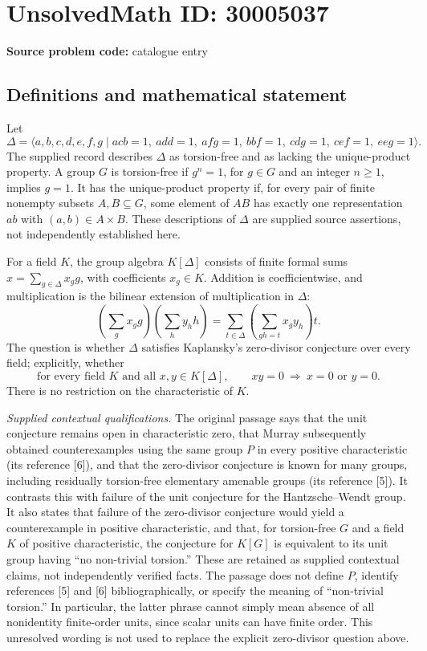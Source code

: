 \documentclass[11pt]{article}
\begin{document}
\section*{UnsolvedMath ID: 30005037}
\textbf{Source problem code:} catalogue entry
\subsection{Definitions and mathematical statement}
Let
\[
\Delta=\langle a,b,c,d,e,f,g\mid acb=1,\ add=1,\ afg=1,\ bbf=1,\ cdg=1,\ cef=1,\ eeg=1\rangle.
\]
The supplied record describes \(\Delta\) as torsion-free and as lacking the unique-product property. A group \(G\) is torsion-free if \(g^n=1\), for \(g\in G\) and an integer \(n\geq 1\), implies \(g=1\). It has the unique-product property if, for every pair of finite nonempty subsets \(A,B\subseteq G\), some element of \(AB\) has exactly one representation \(ab\) with \((a,b)\in A\times B\). These descriptions of \(\Delta\) are supplied source assertions, not independently established here.

For a field \(K\), the group algebra \(K[\Delta]\) consists of finite formal sums \(x=\sum_{g\in\Delta}x_g g\), with coefficients \(x_g\in K\). Addition is coefficientwise, and multiplication is the bilinear extension of multiplication in \(\Delta\):
\[
\left(\sum_g x_g g\right)\left(\sum_h y_h h\right)
=\sum_{t\in\Delta}\left(\sum_{gh=t}x_g y_h\right)t.
\]
The question is whether \(\Delta\) satisfies Kaplansky's zero-divisor conjecture over every field; explicitly, whether
\[
\text{for every field }K\text{ and all }x,y\in K[\Delta],
\qquad xy=0\ \Longrightarrow\ x=0\text{ or }y=0.
\]
There is no restriction on the characteristic of \(K\).

\textit{Supplied contextual qualifications.} The original passage says that the unit conjecture remains open in characteristic zero, that Murray subsequently obtained counterexamples using the same group \(P\) in every positive characteristic (its reference [6]), and that the zero-divisor conjecture is known for many groups, including residually torsion-free elementary amenable groups (its reference [5]). It contrasts this with failure of the unit conjecture for the Hantzsche--Wendt group. It also states that failure of the zero-divisor conjecture would yield a counterexample in positive characteristic, and that, for torsion-free \(G\) and a field \(K\) of positive characteristic, the conjecture for \(K[G]\) is equivalent to its unit group having ``no non-trivial torsion.'' These are retained as supplied contextual claims, not independently verified facts. The passage does not define \(P\), identify references [5] and [6] bibliographically, or specify the meaning of ``non-trivial torsion.'' In particular, the latter phrase cannot simply mean absence of all nonidentity finite-order units, since scalar units can have finite order. This unresolved wording is not used to replace the explicit zero-divisor question above.
\end{document}

